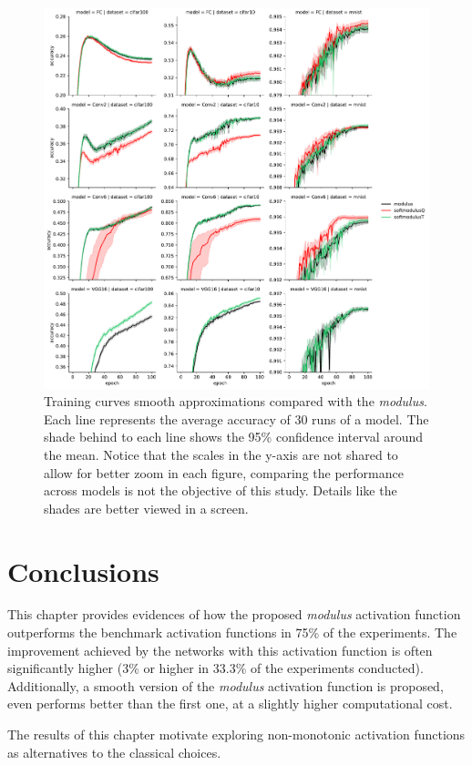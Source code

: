 \begin{figure}[h!]
	\centering
	\includegraphics[width=1.0\linewidth]{modulus/images/training_curves_smooth}
	\caption[Training curves for the smooth approx. of the \textit{modulus} function]{Training curves smooth approximations compared with the \textit{modulus}. Each line represents the average accuracy of 30 runs of a model. The shade behind to each line shows the 95\% confidence interval around the mean. Notice that the scales in the y-axis are not shared to allow for better zoom in each figure, comparing the performance across models is not the objective of this study. Details like the shades are better viewed in a screen.}
	\label{fig:training_curves_smooth}
\end{figure}


\section{Conclusions} \label{sec:modulus_conclusions}
This chapter provides evidences of how the proposed \textit{modulus} activation function outperforms the benchmark activation functions in 75\% of the experiments. The improvement achieved by the networks with this activation function is often significantly higher ($3\%$ or higher in 33.3$\%$ of the experiments conducted). Additionally, a smooth version of the \textit{modulus} activation function is proposed, even performs better than the first one, at a slightly higher computational cost.

The results of this chapter motivate exploring non-monotonic activation functions as alternatives to the classical choices.





